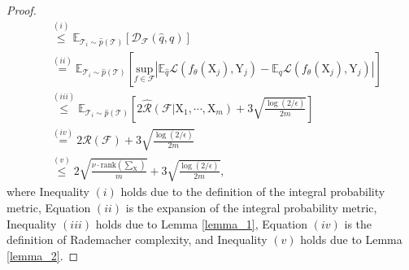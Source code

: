 \begin{proof}
\begin{equation}
\begin{aligned}
    &\overset{(i)}{\leq} \mathbb E_{\mathcal{T}_i\sim \hat{p}(\mathcal{T})}[\mathcal{D}_\mathcal{F}(\hat{q},q)] \\
    &\overset{(ii)}{=} \mathbb E_{\mathcal{T}_i\sim \hat{p}(\mathcal{T})}\left[\underset{f\in\mathcal{F}}{\text{sup}}\left|\mathbb{E}_{\hat{q}}\mathcal{L}(f_\theta(\mathrm{X}_j),\mathrm{Y}_j) - \mathbb E_q\mathcal{L}(f_\theta(\mathrm{X}_j),\mathrm{Y}_j)\right|\right] \\
    &\overset{(iii)}{\leq} \mathbb E_{\mathcal{T}_i\sim \hat{p}(\mathcal{T})} \left[2\hat{\mathcal{R}}(\mathcal{F}|\mathrm{X}_1,\cdots,\mathrm{X}_m)+3\sqrt{\frac{\log(2/\epsilon)}{2m}}\right] \\
    &\overset{(iv)}{=}2\mathcal{R}(\mathcal{F}) + 3\sqrt{\frac{\log(2/\epsilon)}{2m}} \\
    &\overset{(v)}{\leq}2\sqrt{\frac{\nu\cdot\textrm{rank}(\sum_\mathrm{X})}{m}} + 3\sqrt{\frac{\log(2/\epsilon)}{2m}},
\end{aligned}
\end{equation}
where Inequality $(i)$ holds due to the definition of the integral probability metric, Equation $(ii)$ is the expansion of the integral probability metric, Inequality $(iii)$ holds due to Lemma \ref{lemma_1}, Equation $(iv)$ is the definition of Rademacher complexity, and Inequality $(v)$ holds due to Lemma \ref{lemma_2}.


\end{proof}
